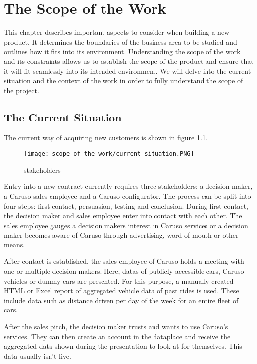 \chapter{The Scope of the Work}

This chapter describes important aspects to consider when building a new product. It determines the boundaries of the business area to be studied and outlines how it fits into its environment. Understanding the scope of the work and its constraints allows us to establish the scope of the product and ensure that it will fit seamlessly into its intended environment. We will delve into the current situation and the context of the work in order to fully understand the scope of the project.

\section{The Current Situation}
The current way of acquiring new customers is shown in figure \ref{ScopeOfWork:Situation}.
\begin{figure}[ht]
  \centering
  \texttt{[image: scope\_of\_the\_work/current\_situation.PNG]}
  \caption{\Glspl{stakeholder}}
  \label{ScopeOfWork:Situation}
\end{figure}

Entry into a new contract currently requires three \glspl{stakeholder}: a decision maker, a Caruso sales employee and a Caruso configurator. The process can be split into four steps: first contact, persuasion, testing and conclusion. During first contact, the decision maker and sales employee enter into contact with each other. The sales employee gauges a decision makers interest in Caruso services or a decision maker becomes aware of Caruso through advertising, word of mouth or other means.

After contact is established, the sales employee of Caruso holds a meeting with one or multiple decision makers. Here, \glspl{data} of publicly accessible cars, Caruso vehicles or dummy cars are presented. For this purpose, a manually created HTML or Excel report of aggregated vehicle data of past rides is used. These include data such as distance driven per day of the week for an entire fleet of cars.

After the sales pitch, the decision maker trusts and wants to use Caruso's services. They can then create an account in the \gls{dataplace} and receive the aggregated data shown during the presentation to look at for themselves. This data usually isn't live.

